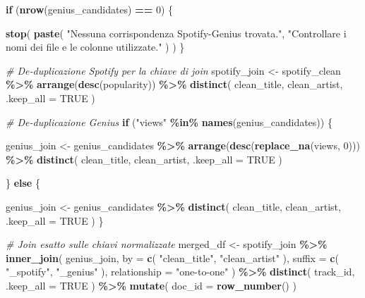 \documentclass[
]{article}
\newenvironment{Shaded}{\begin{snugshade}}{\end{snugshade}}
\newcommand{\AttributeTok}[1]{\textcolor[rgb]{0.13,0.29,0.53}{#1}}
\newcommand{\CommentTok}[1]{\textcolor[rgb]{0.56,0.35,0.01}{\textit{#1}}}
\newcommand{\ConstantTok}[1]{\textcolor[rgb]{0.56,0.35,0.01}{#1}}
\newcommand{\ControlFlowTok}[1]{\textcolor[rgb]{0.13,0.29,0.53}{\textbf{#1}}}
\newcommand{\DecValTok}[1]{\textcolor[rgb]{0.00,0.00,0.81}{#1}}
\newcommand{\FunctionTok}[1]{\textcolor[rgb]{0.13,0.29,0.53}{\textbf{#1}}}
\newcommand{\NormalTok}[1]{#1}
\newcommand{\OtherTok}[1]{\textcolor[rgb]{0.56,0.35,0.01}{#1}}
\newcommand{\SpecialCharTok}[1]{\textcolor[rgb]{0.81,0.36,0.00}{\textbf{#1}}}
\newcommand{\StringTok}[1]{\textcolor[rgb]{0.31,0.60,0.02}{#1}}
\begin{document}
\begin{Shaded}
\begin{Highlighting}[]
\ControlFlowTok{if}\NormalTok{ (}\FunctionTok{nrow}\NormalTok{(genius\_candidates) }\SpecialCharTok{==} \DecValTok{0}\NormalTok{) \{}

  \FunctionTok{stop}\NormalTok{(}
    \FunctionTok{paste}\NormalTok{(}
      \StringTok{"Nessuna corrispondenza Spotify{-}Genius trovata."}\NormalTok{,}
      \StringTok{"Controllare i nomi dei file e le colonne utilizzate."}
\NormalTok{    )}
\NormalTok{  )}
\NormalTok{\}}

\CommentTok{\# De{-}duplicazione Spotify per la chiave di join}
\NormalTok{spotify\_join }\OtherTok{\textless{}{-}}\NormalTok{ spotify\_clean }\SpecialCharTok{\%\textgreater{}\%}
  \FunctionTok{arrange}\NormalTok{(}\FunctionTok{desc}\NormalTok{(popularity)) }\SpecialCharTok{\%\textgreater{}\%}
  \FunctionTok{distinct}\NormalTok{(}
\NormalTok{    clean\_title,}
\NormalTok{    clean\_artist,}
    \AttributeTok{.keep\_all =} \ConstantTok{TRUE}
\NormalTok{  )}

\CommentTok{\# De{-}duplicazione Genius}
\ControlFlowTok{if}\NormalTok{ (}\StringTok{"views"} \SpecialCharTok{\%in\%} \FunctionTok{names}\NormalTok{(genius\_candidates)) \{}

\NormalTok{  genius\_join }\OtherTok{\textless{}{-}}\NormalTok{ genius\_candidates }\SpecialCharTok{\%\textgreater{}\%}
    \FunctionTok{arrange}\NormalTok{(}\FunctionTok{desc}\NormalTok{(}\FunctionTok{replace\_na}\NormalTok{(views, }\DecValTok{0}\NormalTok{))) }\SpecialCharTok{\%\textgreater{}\%}
    \FunctionTok{distinct}\NormalTok{(}
\NormalTok{      clean\_title,}
\NormalTok{      clean\_artist,}
      \AttributeTok{.keep\_all =} \ConstantTok{TRUE}
\NormalTok{    )}

\NormalTok{\} }\ControlFlowTok{else}\NormalTok{ \{}

\NormalTok{  genius\_join }\OtherTok{\textless{}{-}}\NormalTok{ genius\_candidates }\SpecialCharTok{\%\textgreater{}\%}
    \FunctionTok{distinct}\NormalTok{(}
\NormalTok{      clean\_title,}
\NormalTok{      clean\_artist,}
      \AttributeTok{.keep\_all =} \ConstantTok{TRUE}
\NormalTok{    )}
\NormalTok{\}}

\CommentTok{\# Join esatto sulle chiavi normalizzate}
\NormalTok{merged\_df }\OtherTok{\textless{}{-}}\NormalTok{ spotify\_join }\SpecialCharTok{\%\textgreater{}\%}
  \FunctionTok{inner\_join}\NormalTok{(}
\NormalTok{    genius\_join,}
    \AttributeTok{by =} \FunctionTok{c}\NormalTok{(}
      \StringTok{"clean\_title"}\NormalTok{,}
      \StringTok{"clean\_artist"}
\NormalTok{    ),}
    \AttributeTok{suffix =} \FunctionTok{c}\NormalTok{(}
      \StringTok{"\_spotify"}\NormalTok{,}
      \StringTok{"\_genius"}
\NormalTok{    ),}
    \AttributeTok{relationship =} \StringTok{"one{-}to{-}one"}
\NormalTok{  ) }\SpecialCharTok{\%\textgreater{}\%}
  \FunctionTok{distinct}\NormalTok{(}
\NormalTok{    track\_id,}
    \AttributeTok{.keep\_all =} \ConstantTok{TRUE}
\NormalTok{  ) }\SpecialCharTok{\%\textgreater{}\%}
  \FunctionTok{mutate}\NormalTok{(}
    \AttributeTok{doc\_id =} \FunctionTok{row\_number}\NormalTok{()}
\NormalTok{  )}
\end{Highlighting}
\end{Shaded}
\end{document}
